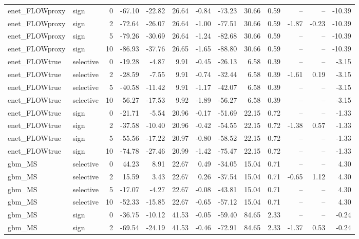 \begin{tabular}{llrrrrrrrrrrr}
enet_FLOWproxy & sign & 0 & -67.10 & -22.82 & 26.64 & -0.84 & -73.23 & 30.66 & 0.59 & -- & -- & -10.39 \\
enet_FLOWproxy & sign & 2 & -72.64 & -26.07 & 26.64 & -1.00 & -77.51 & 30.66 & 0.59 & -1.87 & -0.23 & -10.39 \\
enet_FLOWproxy & sign & 5 & -79.26 & -30.69 & 26.64 & -1.24 & -82.68 & 30.66 & 0.59 & -- & -- & -10.39 \\
enet_FLOWproxy & sign & 10 & -86.93 & -37.76 & 26.65 & -1.65 & -88.80 & 30.66 & 0.59 & -- & -- & -10.39 \\
enet_FLOWtrue & selective & 0 & -19.28 & -4.87 & 9.91 & -0.45 & -26.13 & 6.58 & 0.39 & -- & -- & -3.15 \\
enet_FLOWtrue & selective & 2 & -28.59 & -7.55 & 9.91 & -0.74 & -32.44 & 6.58 & 0.39 & -1.61 & 0.19 & -3.15 \\
enet_FLOWtrue & selective & 5 & -40.58 & -11.42 & 9.91 & -1.17 & -42.07 & 6.58 & 0.39 & -- & -- & -3.15 \\
enet_FLOWtrue & selective & 10 & -56.27 & -17.53 & 9.92 & -1.89 & -56.27 & 6.58 & 0.39 & -- & -- & -3.15 \\
enet_FLOWtrue & sign & 0 & -21.71 & -5.54 & 20.96 & -0.17 & -51.69 & 22.15 & 0.72 & -- & -- & -1.33 \\
enet_FLOWtrue & sign & 2 & -37.58 & -10.40 & 20.96 & -0.42 & -54.55 & 22.15 & 0.72 & -1.38 & 0.57 & -1.33 \\
enet_FLOWtrue & sign & 5 & -55.56 & -17.22 & 20.97 & -0.80 & -58.52 & 22.15 & 0.72 & -- & -- & -1.33 \\
enet_FLOWtrue & sign & 10 & -74.78 & -27.46 & 20.99 & -1.42 & -75.47 & 22.15 & 0.72 & -- & -- & -1.33 \\
gbm_MS & selective & 0 & 44.23 & 8.91 & 22.67 & 0.49 & -34.05 & 15.04 & 0.71 & -- & -- & 4.30 \\
gbm_MS & selective & 2 & 15.59 & 3.43 & 22.67 & 0.26 & -37.54 & 15.04 & 0.71 & -0.65 & 1.12 & 4.30 \\
gbm_MS & selective & 5 & -17.07 & -4.27 & 22.67 & -0.08 & -43.81 & 15.04 & 0.71 & -- & -- & 4.30 \\
gbm_MS & selective & 10 & -52.33 & -15.85 & 22.67 & -0.65 & -57.12 & 15.04 & 0.71 & -- & -- & 4.30 \\
gbm_MS & sign & 0 & -36.75 & -10.12 & 41.53 & -0.05 & -59.40 & 84.65 & 2.33 & -- & -- & -0.24 \\
gbm_MS & sign & 2 & -69.54 & -24.19 & 41.53 & -0.46 & -72.91 & 84.65 & 2.33 & -1.37 & 0.53 & -0.24 \\

\end{tabular}
